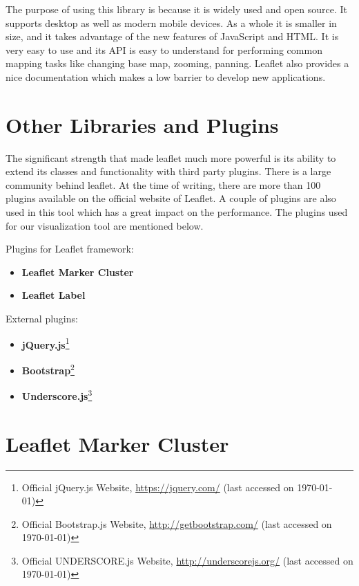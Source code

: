 The purpose of using this library is because it is widely used and open source. It supports desktop as well as modern mobile devices. As a whole it is smaller in size, and it takes advantage of the new features of JavaScript and HTML. It is very easy to use and its API is easy to understand for performing common mapping tasks like changing base map, zooming, panning. Leaflet also provides a nice documentation which makes a low barrier to develop new applications.

\section{Other Libraries and Plugins}
\label{olandp}

The significant strength that made leaflet much more powerful is its ability to extend its classes and functionality with third party plugins. There is a large community behind leaflet. At the time of writing, there are more than 100 plugins available on the official website of Leaflet. A couple of plugins are also used in this tool which has a great impact on the performance. The plugins used for our visualization tool are mentioned below.

Plugins for Leaflet framework:
\begin{itemize}
  \item \textbf{Leaflet Marker Cluster}
  \item \textbf{Leaflet Label}
\end{itemize}
External plugins:
\begin{itemize}
  \item \textbf{jQuery.js}\footnote{Official jQuery.js Website, \url{https://jquery.com/} (last accessed on \today)}
  \item \textbf{Bootstrap}\footnote{Official Bootstrap.js Website, \url{http://getbootstrap.com/}   (last accessed on \today)}
  \item \textbf{Underscore.js}\footnote{Official UNDERSCORE.js Website, \url{http://underscorejs.org/}  (last accessed on \today)}
\end{itemize}

\section*{Leaflet Marker Cluster}
\label{sec:clusterr}

